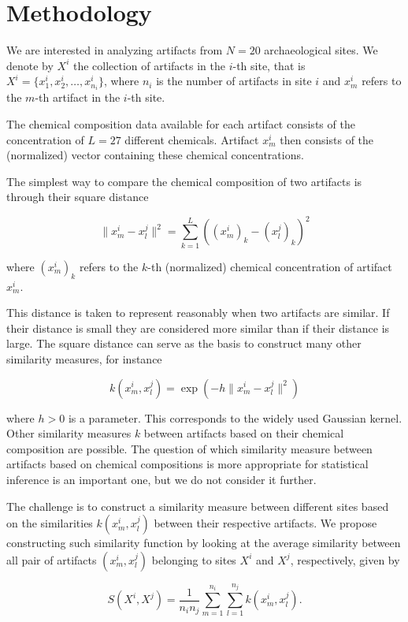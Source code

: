 \section{Methodology}

\label{sec:methodology}


We are interested in analyzing artifacts from $N=20$ archaeological sites. We denote by $X^i$ the collection of artifacts in the $i$-th site, that is $X^i=\{x^i_1,x^i_2,\dots,x^i_{n_i}\}$, where $n_i$ is the number of artifacts in site $i$ and $x^i_m$ refers to the $m$-th artifact in the $i$-th site.

The chemical composition data available for each artifact consists of the concentration of $L=27$ different chemicals. Artifact $x^i_m$ then consists of the (normalized) vector containing these chemical concentrations.

The simplest way to compare the chemical composition of two artifacts is through their square distance

$$ \| x^i_m - x^j_l \|^2 = \sum_{k=1}^L ( (x^i_m)_k - (x^j_l)_k )^2$$

where $(x^i_m)_k$ refers to the $k$-th (normalized) chemical concentration of artifact $x^i_m$.

This distance is taken to represent reasonably when two artifacts are similar. If their distance is small they are considered more similar than if their distance is large. The square distance can serve as the basis to construct many other similarity measures, for instance

$$ k(x^i_m,x^j_l) = \exp(-h\|x^i_m - x^j_l \|^2)$$

where $h>0$ is a parameter. This corresponds to the widely used Gaussian kernel. Other similarity measures $k$ between artifacts based on their chemical composition are possible. The question of which similarity measure between artifacts based on chemical compositions is more appropriate for statistical inference is an important one, but we do not consider it further.

The challenge is to construct a similarity measure between different sites based on the similarities ${k(x^i_m,x^j_l)}$ between their respective artifacts. We propose constructing such similarity function by looking at the average similarity between all pair of artifacts $(x^i_m,x^j_l)$ belonging to sites $X^i$ and $X^j$, respectively, given by

$$S(X^i,X^j) = \frac{1}{n_i n_j} \sum_{m=1}^{n_i} \sum_{l=1}^{n_j} k(x^i_m,x^j_l).$$


